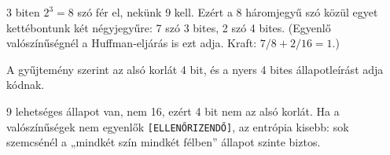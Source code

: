 3 biten $2^3=8$ szó fér el, nekünk 9 kell. Ezért a 8 háromjegyű szó közül egyet kettébontunk két négyjegyűre: 7 szó 3 bites, 2 szó 4 bites. (Egyenlő valószínűségnél a Huffman-eljárás is ezt adja. Kraft: $7/8+2/16=1$.)

\begin{center}\end{center}

\begin{center}\end{center}
\begin{tipp}
A gyűjtemény szerint az alsó korlát 4 bit, és a nyers 4 bites állapotleírást adja kódnak.
\end{tipp}
\begin{figyelem}[Javítás]
9 lehetséges állapot van, nem 16, ezért 4 bit nem az alsó korlát. Ha a valószínűségek nem egyenlők \texttt{[ELLENŐRIZENDŐ]}, az entrópia kisebb: sok szemcsénél a „mindkét szín mindkét félben” állapot szinte biztos.
\end{figyelem}
\begin{eredmeny}

\begin{center}\end{center}
\end{eredmeny}


